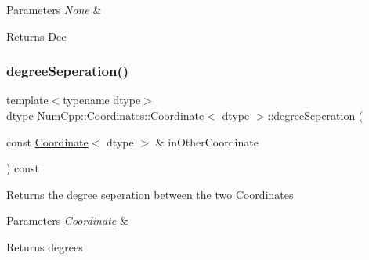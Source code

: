 \begin{DoxyParams}{Parameters}
{\em None} & \\
\hline
\end{DoxyParams}
\begin{DoxyReturn}{Returns}
\mbox{\hyperlink{class_num_cpp_1_1_coordinates_1_1_dec}{Dec}} 
\end{DoxyReturn}
\mbox{\label{class_num_cpp_1_1_coordinates_1_1_coordinate_a00a50c0182dc1e7a3bee136055f133aa}} 
\subsubsection{\texorpdfstring{degree\+Seperation()}{degreeSeperation()}\hspace{0.1cm}{\footnotesize\ttfamily [1/2]}}
{\footnotesize\ttfamily template$<$typename dtype$>$ \\
dtype \mbox{\hyperlink{class_num_cpp_1_1_coordinates_1_1_coordinate}{Num\+Cpp\+::\+Coordinates\+::\+Coordinate}}$<$ dtype $>$\+::degree\+Seperation (\begin{DoxyParamCaption}\item[{const \mbox{\hyperlink{class_num_cpp_1_1_coordinates_1_1_coordinate}{Coordinate}}$<$ dtype $>$ \&}]{in\+Other\+Coordinate }\end{DoxyParamCaption}) const\hspace{0.3cm}{\ttfamily [inline]}}

Returns the degree seperation between the two \mbox{\hyperlink{namespace_num_cpp_1_1_coordinates}{Coordinates}}


\begin{DoxyParams}{Parameters}
{\em \mbox{\hyperlink{class_num_cpp_1_1_coordinates_1_1_coordinate}{Coordinate}}} & \\
\hline
\end{DoxyParams}
\begin{DoxyReturn}{Returns}
degrees 
\end{DoxyReturn}
\mbox{\label{class_num_cpp_1_1_coordinates_1_1_coordinate_a3e9c20dfa5ec3045f746344542c06e81}} 
